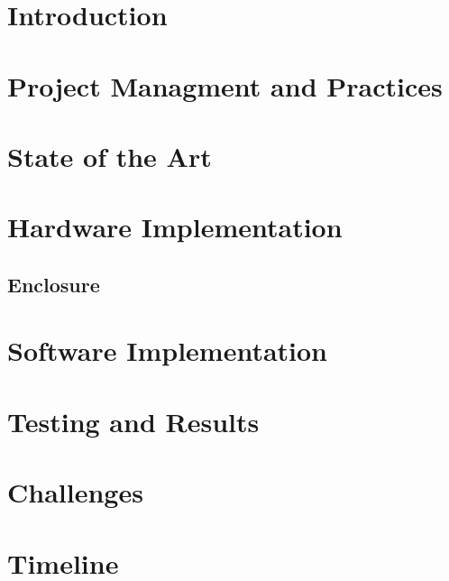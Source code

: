 \documentclass[11pt,letterpaper]{article}
\begin{document}
\listoftables
\clearpage


\section{Introduction}
\label{sec:introduction}

\clearpage

\section{Project Managment and Practices}
\label{sec:engineering}

\clearpage

\section{State of the Art}
\label{sec:state-of-the-art}

\clearpage

\section{Hardware Implementation}
\label{sec:hardware}


\subsection{Enclosure}
\label{sec:enclosure}

\clearpage

\section{Software Implementation}
\label{sec:software}

\clearpage

\section{Testing and Results}
\label{sec:testing}

\clearpage

\section{Challenges}
\label{sec:challenges}

\clearpage

\section{Timeline}
\label{sec:timeline}

\clearpage
\end{document}
